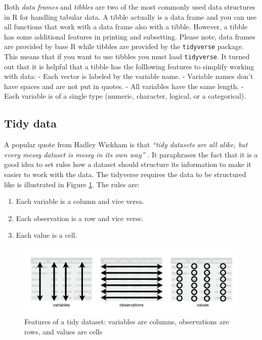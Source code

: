 \documentclass[
  12pt,
  oneside]{book}
\providecommand{\tightlist}{%
  \setlength{\itemsep}{0pt}\setlength{\parskip}{0pt}}
\theoremstyle{definition}
\theoremstyle{definition}
\theoremstyle{definition}
\theoremstyle{definition}
\theoremstyle{remark}
\begin{document}
Both \emph{data frames} and \emph{tibbles} are two of the most commonly used data structures in R for handling tabular data. A tibble actually is a data frame and you can use all functions that work with a data frame also with a tibble. However, a tibble has some additional features in printing and subsetting. Please note, data frames are provided by base R while tibbles are provided by the \texttt{tidyverse} package. This means that if you want to use tibbles you must load \texttt{tidyverse}. It turned out that it is helpful that a tibble has the folllowing features to simplify working with data:
- Each vector is labeled by the variable name.
- Variable names don't have spaces and are not put in quotes.
- All variables have the same length.
- Each variable is of a single type (numeric, character, logical, or a categorical).

\hypertarget{tidy-data}{%
\subsection{Tidy data}\label{tidy-data}}

A popular quote from Hadley Wickham is that \emph{``tidy datasets are all alike, but every messy dataset is messy in its own way''} \citep[p.~2]{Hadley2014Tidy}. It paraphrases the fact that it is a good idea to set rules how a dataset should structure its information to make it easier to work with the data. The tidyverse requires the data to be structured like is illustrated in Figure \ref{fig:tidy-1}. The rules are:

\begin{enumerate}
\def\labelenumi{\arabic{enumi}.}
\tightlist
\item
  Each variable is a column and vice versa.
\item
  Each observation is a row and vice verse.
\item
  Each value is a cell.
\end{enumerate}

\begin{figure}
\centering
\includegraphics[width=1\textwidth,height=\textheight]{fig/tidy-1.png}
\caption[\label{fig:tidy-1} Features of a tidy dataset: variables are columns, observations are rows, and values are cells]{\label{fig:tidy-1} Features of a tidy dataset: variables are columns, observations are rows, and values are cells\footnotemark{}}
\end{figure}
\end{document}
